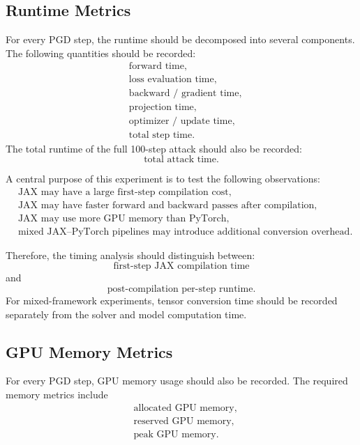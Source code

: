 \documentclass{article}
\begin{document}
\subsection{Runtime Metrics}

For every PGD step, the runtime should be decomposed into several components. The following quantities should be recorded:
\[
\begin{aligned}
&\text{forward time},\\
&\text{loss evaluation time},\\
&\text{backward / gradient time},\\
&\text{projection time},\\
&\text{optimizer / update time},\\
&\text{total step time}.
\end{aligned}
\]
The total runtime of the full 100-step attack should also be recorded:
\[
\text{total attack time}.
\]

A central purpose of this experiment is to test the following observations:
\[
\begin{aligned}
&\text{JAX may have a large first-step compilation cost},\\
&\text{JAX may have faster forward and backward passes after compilation},\\
&\text{JAX may use more GPU memory than PyTorch},\\
&\text{mixed JAX--PyTorch pipelines may introduce additional conversion overhead}.
\end{aligned}
\]

Therefore, the timing analysis should distinguish between:
\[
\text{first-step JAX compilation time}
\]
and
\[
\text{post-compilation per-step runtime}.
\]
For mixed-framework experiments, tensor conversion time should be recorded separately from the solver and model computation time.

\subsection{GPU Memory Metrics}

For every PGD step, GPU memory usage should also be recorded. The required memory metrics include
\[
\begin{aligned}
&\text{allocated GPU memory},\\
&\text{reserved GPU memory},\\
&\text{peak GPU memory}.
\end{aligned}
\]
\end{document}
